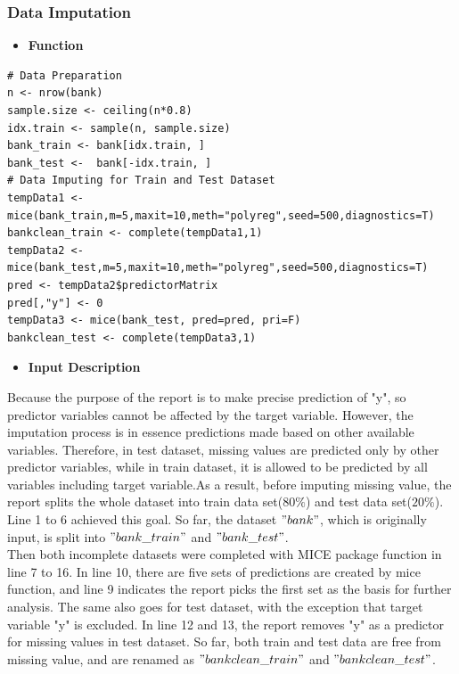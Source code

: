          \subsubsection{Data Imputation}
         \begin{itemize}
         	\item \textbf{Function}
         \end{itemize}
         \begin{lstlisting}
# Data Preparation
n <- nrow(bank) 
sample.size <- ceiling(n*0.8) 
idx.train <- sample(n, sample.size) 
bank_train <- bank[idx.train, ] 
bank_test <-  bank[-idx.train, ]         
# Data Imputing for Train and Test Dataset
tempData1 <- mice(bank_train,m=5,maxit=10,meth="polyreg",seed=500,diagnostics=T)
bankclean_train <- complete(tempData1,1)
tempData2 <- mice(bank_test,m=5,maxit=10,meth="polyreg",seed=500,diagnostics=T)
pred <- tempData2$predictorMatrix
pred[,"y"] <- 0
tempData3 <- mice(bank_test, pred=pred, pri=F)
bankclean_test <- complete(tempData3,1)
         \end{lstlisting}
         \begin{itemize}
         	\item \textbf{Input Description}
         \end{itemize}
     \noindent Because the purpose of the report is to make precise prediction of "y", so predictor variables cannot be affected by the target variable. However, the imputation process is in essence predictions made based on other available variables. Therefore, in test dataset, missing values are predicted only by other predictor variables, while in train dataset, it is allowed to be predicted by all variables including target variable.As a result, before imputing missing value, the report splits the whole dataset into train data set($80\%$) and test data set($20\%$). Line 1 to 6 achieved this goal. So far, the dataset $"bank"$, which is originally input, is split into $"bank\_train"$ and $"bank\_test"$. \\
     [\baselineskip]\indent Then both incomplete datasets were completed with MICE package function in line 7 to 16. In line 10, there are five sets of predictions are created by mice function, and line 9 indicates the report picks the first set as the basis for further analysis. The same also goes for test dataset, with the exception that target variable "y" is excluded. In line 12 and 13, the report removes "y" as a predictor for missing values in test dataset. So far, both train and test data are free from missing value, and are renamed as $"bankclean\_train"$ and $"bankclean\_test"$.\\           
